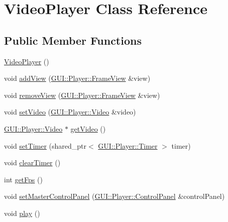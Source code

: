 \hypertarget{classGUI_1_1Player_1_1VideoPlayer}{}\section{Video\+Player Class Reference}
\label{classGUI_1_1Player_1_1VideoPlayer}
\subsection*{Public Member Functions}
\begin{DoxyCompactItemize}
\item 
\hyperlink{classGUI_1_1Player_1_1VideoPlayer_af6d7bb082887f6a9738741778c58daf8}{Video\+Player} ()
\item 
void \hyperlink{classGUI_1_1Player_1_1VideoPlayer_a8798b9f0655dcf3847ad1819da59323e}{add\+View} (\hyperlink{classGUI_1_1Player_1_1FrameView}{G\+U\+I\+::\+Player\+::\+Frame\+View} \&view)
\item 
void \hyperlink{classGUI_1_1Player_1_1VideoPlayer_a4d9422b651eeeb1e2098195adb7a3501}{remove\+View} (\hyperlink{classGUI_1_1Player_1_1FrameView}{G\+U\+I\+::\+Player\+::\+Frame\+View} \&view)
\item 
void \hyperlink{classGUI_1_1Player_1_1VideoPlayer_a9e4f56467f009458dad24ae7a3e925f9}{set\+Video} (\hyperlink{classGUI_1_1Player_1_1Video}{G\+U\+I\+::\+Player\+::\+Video} \&video)
\item 
\hyperlink{classGUI_1_1Player_1_1Video}{G\+U\+I\+::\+Player\+::\+Video} $\ast$ \hyperlink{classGUI_1_1Player_1_1VideoPlayer_a65419d9046cd65aeebf45a22a262461d}{get\+Video} ()
\item 
void \hyperlink{classGUI_1_1Player_1_1VideoPlayer_a97f5a0565ad9ef416d44823431d0c376}{set\+Timer} (shared\+\_\+ptr$<$ \hyperlink{classGUI_1_1Player_1_1Timer}{G\+U\+I\+::\+Player\+::\+Timer} $>$ timer)
\item 
void \hyperlink{classGUI_1_1Player_1_1VideoPlayer_ac99343fd51cdad1ee430905a00791ade}{clear\+Timer} ()
\item 
int \hyperlink{classGUI_1_1Player_1_1VideoPlayer_a519ad5c0664b9de28c1a6d9dc77f959d}{get\+Fps} ()
\item 
void \hyperlink{classGUI_1_1Player_1_1VideoPlayer_a152f8d8b5f3756518ea5b57ad12814a3}{set\+Master\+Control\+Panel} (\hyperlink{classGUI_1_1Player_1_1ControlPanel}{G\+U\+I\+::\+Player\+::\+Control\+Panel} \&control\+Panel)
\item 
void \hyperlink{classGUI_1_1Player_1_1VideoPlayer_a6d58098c6cf63c241ed03bc797256bb1}{play} ()

\end{DoxyCompactItemize}
